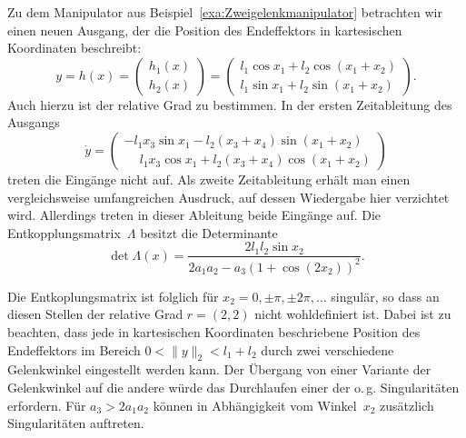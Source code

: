 \begin{example}
\label{exa:Zweigelenkmanipulator-kartesisch}Zu dem Manipulator aus
Beispiel~\ref{exa:Zweigelenkmanipulator} betrachten wir einen neuen
Ausgang, der die Position des Endeffektors in kartesischen Koordinaten
beschreibt:
\[
y=h(x)=\left(\begin{array}{c}
h_{1}(x)\\
h_{2}(x)
\end{array}\right)=\left(\begin{array}{c}
l_{1}\cos x_{1}+l_{2}\cos(x_{1}+x_{2})\\
l_{1}\sin x_{1}+l_{2}\sin(x_{1}+x_{2})
\end{array}\right).
\]
Auch hierzu ist der relative Grad zu bestimmen. In der ersten Zeitableitung
des Ausgangs
\[
\dot{y}=\left(\begin{array}{c}
-l_{1}x_{3}\sin x_{1}-l_{2}(x_{3}+x_{4})\sin(x_{1}+x_{2})\\
\phantom{+}l_{1}x_{3}\cos x_{1}+l_{2}(x_{3}+x_{4})\cos(x_{1}+x_{2})
\end{array}\right)
\]
treten die Eingänge nicht auf. Als zweite Zeitableitung erhält man
einen vergleichsweise umfangreichen Ausdruck, auf dessen Wiedergabe
hier verzichtet wird. Allerdings treten in dieser Ableitung beide
Eingänge auf. Die Entkopplungsmatrix~$\Lambda$ besitzt die Determinante
\[
\det\Lambda(x)=\frac{2l_{1}l_{2}\sin x_{2}}{2a_{1}a_{2}-a_{3}(1+\cos(2x_{2}))^{2}}.
\]

Die Entkoplungsmatrix ist folglich für $x_{2}=0,\pm\pi,\pm2\pi,\ldots$
singulär, so dass an diesen Stellen der relative Grad $r=(2,2)$ nicht
wohldefiniert ist. Dabei ist zu beachten, dass jede in kartesischen
Koordinaten beschriebene Position des Endeffektors im Bereich $0<\|y\|_{2}<l_{1}+l_{2}$
durch zwei verschiedene Gelenkwinkel eingestellt werden kann. Der
Übergang von einer Variante der Gelenkwinkel auf die andere würde
das Durchlaufen einer der o.\,g. Singularitäten erfordern. Für $a_{3}>2a_{1}a_{2}$
können in Abhängigkeit vom Winkel~$x_{2}$ zusätzlich Singularitäten
auftreten.
\end{example}

